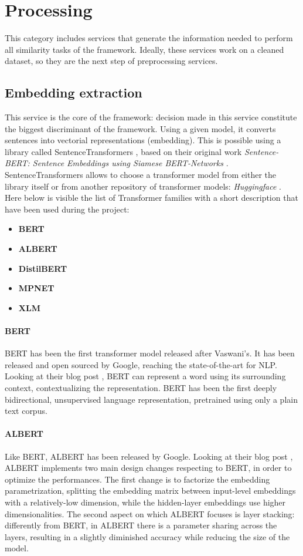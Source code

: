 \documentclass[\main/main.tex]{subfiles}
\begin{document}
\section{Processing}
This category includes services that generate the information needed to perform all similarity tasks of the framework. Ideally, these services work on a cleaned dataset, so they are the next step of preprocessing services. 
\subsection{Embedding extraction}
This service is the core of the framework: decision made in this service constitute the biggest discriminant of the framework. Using a given model, it converts sentences into vectorial representations (embedding). This is possible using a library called SentenceTransformers \cite{sbert}, based on their original work \emph{Sentence-BERT: Sentence Embeddings using Siamese BERT-Networks} \cite{reimers2019sentencebert}. SentenceTransformers allows to choose a transformer model from either the library itself or from another repository of transformer models: \emph{Huggingface} \cite{huggingface}. Here below is visible the list of Transformer families with a short description that have been used during the project:
\begin{itemize}
    \item \textbf{BERT}
    \item \textbf{ALBERT}
    \item \textbf{DistilBERT}
    \item \textbf{MPNET}
    \item \textbf{XLM}
\end{itemize} 
\paragraph{BERT}
BERT has been the first transformer model released after Vaswani's. It has been released and open sourced by Google, reaching the state-of-the-art for NLP. Looking at their blog post \cite{bert_blog_post}, BERT can represent a word using its surrounding context, contextualizing the representation. BERT has been the first deeply bidirectional, unsupervised language representation, pretrained using only a plain text corpus\cite{DBLP:journals/corr/abs-1810-04805}.
\paragraph{ALBERT}
Like BERT, ALBERT has been released by Google. Looking at their blog post \cite{albert_blog_post}, ALBERT implements two main design changes respecting to BERT, in order to optimize the performances. The first change is to factorize the embedding parametrization, splitting the embedding matrix between input-level embeddings with a relatively-low dimension, while the hidden-layer embeddings use higher dimensionalities. The second aspect on which ALBERT focuses is layer stacking: differently from BERT, in ALBERT there is a parameter sharing across the layers, resulting in a slightly diminished accuracy while reducing the size of the model\cite{DBLP:journals/corr/abs-1909-11942}.
\end{document}
